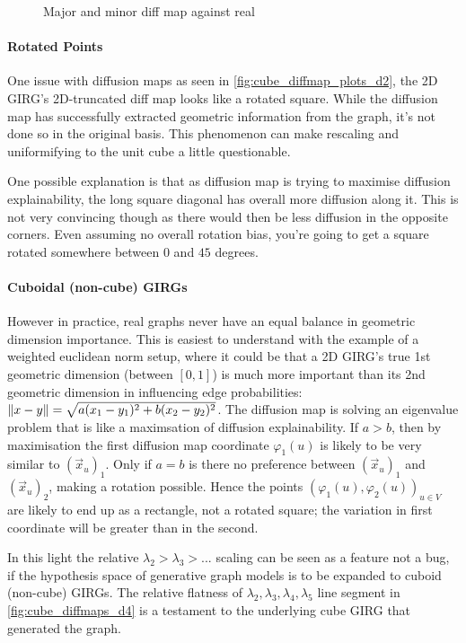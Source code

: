 \begin{figure}
  \caption{Major and minor diff map against real}
  \label{fig:2d_distorted_major_minor}
\end{figure}


\paragraph{Rotated Points} One issue with diffusion maps as seen in \cref{fig:cube_diffmap_plots_d2}, the 2D GIRG's 2D-truncated diff map looks like a rotated square. While the diffusion map has successfully extracted geometric information from the graph, it's not done so in the original basis. This phenomenon can make rescaling and uniformifying to the unit cube a little questionable. 

One possible explanation is that as diffusion map is trying to maximise diffusion explainability, the long square diagonal has overall more diffusion along it. This is not very convincing though as there would then be less diffusion in the opposite corners. Even assuming no overall rotation bias, you're going to get a square rotated somewhere between $0$ and $45$ degrees.

\paragraph{Cuboidal (non-cube) GIRGs} However in practice, real graphs never have an equal balance in geometric dimension importance. This is easiest to understand with the example of a weighted euclidean norm setup, where it could be that a 2D GIRG's true 1st geometric dimension (between $[0, 1]$) is much more important than its 2nd geometric dimension in influencing edge probabilities: $\left\lVert x - y\right\rVert = \sqrt{a (x_1 - y_1)^2 + b(x_2 - y_2)^2}$.
The diffusion map is solving an eigenvalue problem that is like a maximsation of diffusion explainability. If $a > b$, then by maximisation the first diffusion map coordinate $\varphi_1(u)$ is likely to be very similar to $(\vec{x}_u)_1$. Only if $a=b$ is there no preference between $(\vec{x}_u)_1$ and $(\vec{x}_u)_2$, making a rotation possible.
Hence the points $(\varphi_1(u), \varphi_2(u))_{u \in V}$ are likely to end up as a rectangle, not a rotated square; the variation in first coordinate will be greater than in the second.

In this light the relative $\lambda_2 > \lambda_3 > ...$ scaling can be seen as a feature not a bug, if the hypothesis space of generative graph models is to be expanded to cuboid (non-cube) GIRGs.
The relative flatness of $\lambda_2, \lambda_3, \lambda_4, \lambda_5$ line segment in \cref{fig:cube_diffmaps_d4} is a testament to the underlying cube GIRG that generated the graph.




